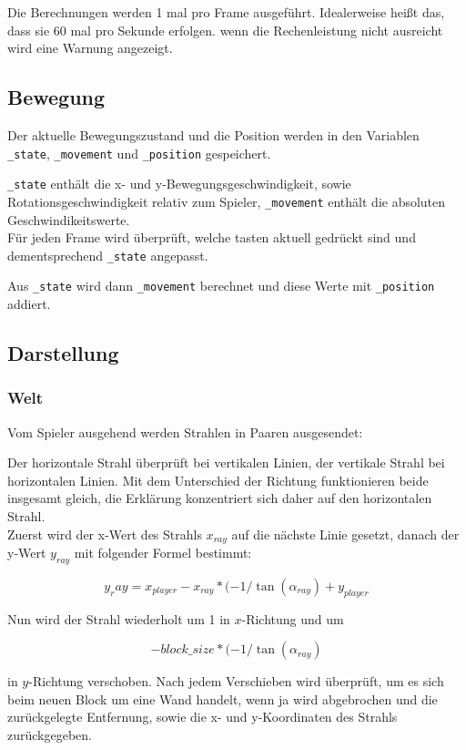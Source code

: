 \documentclass[a4paper,titlepage]{article}
\begin{document}
Die Berechnungen werden 1 mal pro Frame ausgeführt. Idealerweise heißt das, dass sie 60 mal pro Sekunde erfolgen. wenn die Rechenleistung nicht ausreicht wird eine Warnung angezeigt.

\subsection{Bewegung}

Der aktuelle Bewegungszustand und die Position werden in den Variablen \verb|_state|, \verb|_movement| und \verb|_position| gespeichert.

\verb|_state| enthält die x- und y-Bewegungsgeschwindigkeit, sowie Rotationsgeschwindigkeit relativ zum Spieler, \verb|_movement| enthält die absoluten Geschwindikeitswerte.\\

Für jeden Frame wird überprüft, welche tasten aktuell gedrückt sind und dementsprechend \verb|_state| angepasst.

Aus \verb|_state| wird dann \verb|_movement| berechnet und diese Werte mit \verb|_position| addiert.

\subsection{Darstellung}

\subsubsection*{Welt}

Vom Spieler ausgehend werden Strahlen in Paaren ausgesendet:

Der horizontale Strahl überprüft bei vertikalen Linien, der vertikale Strahl bei horizontalen Linien.
Mit dem Unterschied der Richtung funktionieren beide insgesamt gleich, die Erklärung konzentriert sich daher auf den horizontalen Strahl.\\

Zuerst wird der x-Wert des Strahls $x_{ray}$ auf die nächste Linie gesetzt, danach der y-Wert $y_{ray}$ mit folgender Formel bestimmt: 

$$y_ray = x_{player}-x_{ray}*(-1/\tan(\alpha_{ray})+y_{player}$$

Nun wird der Strahl wiederholt um 1 in $x$-Richtung und um

$$-block\_size * (-1/\tan(\alpha_{ray})$$

in $y$-Richtung verschoben. Nach jedem Verschieben wird überprüft, um es sich beim neuen Block um eine Wand handelt, wenn ja wird abgebrochen und die zurückgelegte Entfernung, sowie die x- und y-Koordinaten des Strahls zurückgegeben.\\
\end{document}
